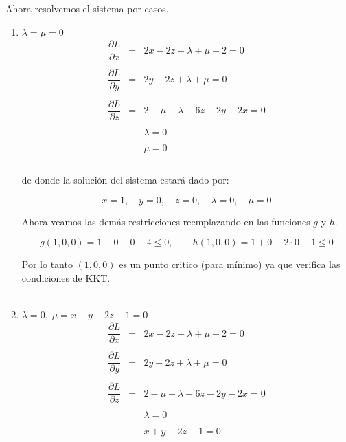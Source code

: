 \begin{enumerate}
\begin{enumerate}[\bfseries a)]
		Ahora resolvemos el sistema por casos.\\


		\begin{enumerate}[1.]

		    \item $\lambda = \mu = 0$\\
			$$\begin{array}{rcl}
			    \dfrac{\partial L}{\partial x}&=&2x-2z+\lambda + \mu -2 = 0\\\\
			    \dfrac{\partial L}{\partial y}&=&2y-2z+\lambda + \mu = 0\\\\
			    \dfrac{\partial L}{\partial z}&=&2-\mu + \lambda +6z-2y-2x=0\\\\
							  &&\lambda= 0\\\\
							  &&\mu = 0\\\\
			\end{array}$$


			de donde la solución del sistema estará dado por:

			$$x=1,\quad y=0,\quad z=0,\quad \lambda=0,\quad \mu=0$$
		    
			Ahora veamos las demás restricciones reemplazando en las funciones $g$ y $h$. 

			$$g(1,0,0)=1-0-0-4\leq 0, \qquad h(1,0,0)=1+0-2\cdot 0 - 1 \leq 0$$
			
			Por lo tanto $(1,0,0)$ es un punto critico (para mínimo) ya que  verifica las condiciones de KKT. \\\\


		    \item $\lambda = 0,\; \mu = x+y-2z-1=0$\\

			$$\begin{array}{rcl}
			    \dfrac{\partial L}{\partial x}&=&2x-2z+\lambda + \mu -2 = 0\\\\
			    \dfrac{\partial L}{\partial y}&=&2y-2z+\lambda + \mu = 0\\\\
			    \dfrac{\partial L}{\partial z}&=&2-\mu + \lambda +6z-2y-2x=0\\\\
							  &&\lambda= 0\\\\
							  &&x+y-2z-1 = 0\\\\
			\end{array}$$


\end{enumerate}
\end{enumerate}
\end{enumerate}
